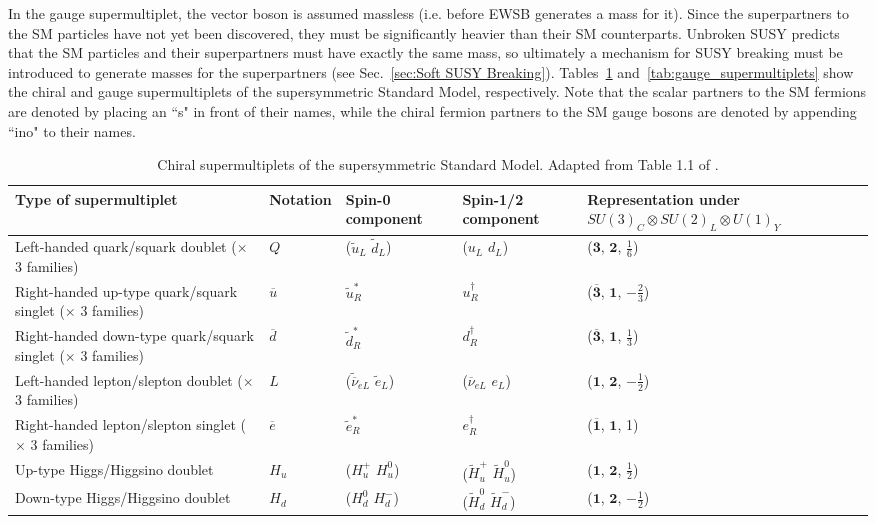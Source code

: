 \documentclass[dissertation.tex]{subfiles}
\begin{document}
In the gauge supermultiplet, the vector boson is assumed massless (i.e. before EWSB generates a mass for it).  Since the superpartners to the SM particles have not yet been discovered, they must be significantly heavier than their SM counterparts.  Unbroken SUSY predicts that the SM particles and their superpartners must have exactly the same mass, so ultimately a mechanism for SUSY breaking must be introduced to generate masses for the superpartners (see Sec.~\ref{sec:Soft SUSY Breaking}).  Tables~\ref{tab:chiral_supermultiplets} and~\ref{tab:gauge_supermultiplets} show the chiral and gauge supermultiplets of the supersymmetric Standard Model, respectively.  Note that the scalar partners to the SM fermions are denoted by placing an ``s" in front of their names, while the chiral fermion partners to the SM gauge bosons are denoted by appending ``ino" to their names.

\begin{table}[htbp]
\caption{Chiral supermultiplets of the supersymmetric Standard Model.  Adapted from Table 1.1 of \cite{SUSY_primer}.}
\begin{tabular}{|m{3cm}|m{2cm}|m{2cm}|m{2cm}|m{4cm}|}
\hline
Type of \newline supermultiplet & Notation & Spin-0 component & Spin-1/2 component & Representation under $SU(3)_{C} \otimes SU(2)_{L} \otimes U(1)_{Y}$ \\
\hline
\hline
Left-handed quark/squark doublet ($\times$ 3 families) & $Q$ & ($\widetilde{u}_{L}$ $\widetilde{d}_{L}$) & ($u_{L}$ $d_{L}$) & ($\mathbf{3}$, $\mathbf{2}$, $\frac{1}{6}$) \\
\hline
Right-handed up-type quark/squark singlet ($\times$ 3 families) & $\overline{u}$ & $\widetilde{u}_{R}^{*}$ & $u_{R}^{\dag}$ & ($\mathbf{\overline{3}}$, $\mathbf{1}$, $-\frac{2}{3}$) \\
\hline
Right-handed down-type quark/squark singlet ($\times$ 3 families) & $\overline{d}$ & $\widetilde{d}_{R}^{*}$ & $d_{R}^{\dag}$ & ($\mathbf{\overline{3}}$, $\mathbf{1}$, $\frac{1}{3}$) \\
\hline
Left-handed lepton/slepton doublet ($\times$ 3 families) & $L$ & ($\widetilde{\overline{\nu}}_{eL}$ $\widetilde{e}_{L}$) & ($\overline{\nu}_{eL}$ $e_{L}$) & ($\mathbf{1}$, $\mathbf{2}$, $-\frac{1}{2}$) \\
\hline
Right-handed lepton/slepton singlet ($\times$ 3 families) & $\overline{e}$ & $\widetilde{e}_{R}^{*}$ & $e_{R}^{\dag}$ & ($\mathbf{\overline{1}}$, $\mathbf{1}$, 1) \\
\hline
Up-type Higgs/Higgsino doublet & $H_{u}$ & ($H_{u}^{+}$ $H_{u}^{0}$) & ($\widetilde{H}_{u}^{+}$ $\widetilde{H}_{u}^{0}$) & ($\mathbf{1}$, $\mathbf{2}$, $\frac{1}{2}$) \\
\hline
Down-type Higgs/Higgsino doublet & $H_{d}$ & ($H_{d}^{0}$ $H_{d}^{-}$) & ($\widetilde{H}_{d}^{0}$ $\widetilde{H}_{d}^{-}$) & ($\mathbf{1}$, $\mathbf{2}$, $-\frac{1}{2}$) \\
\hline
\end{tabular}
\label{tab:chiral_supermultiplets}
\end{table}
\end{document}
